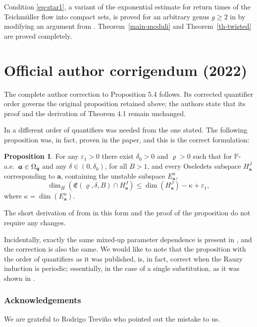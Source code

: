 \documentclass[10pt]{amsart}
\let\epsilon\varepsilon
\theoremstyle{plain}
\theoremstyle{definition}
\newcommand\bom{{\boldsymbol a}}\let\ba\bom
\newcommand\bq{{\boldsymbol q}}
\let\Om\Omega
\newcommand\Fre{\mathfrak{E}}
\renewcommand{\P}{\mathbb{P}}
\newtheorem*{prop*}{Proposition}
\begin{document}
Condition \eqref{eq-star1}, a variant of the exponential estimate for return times of the Teichmüller flow into compact sets, is proved for an arbitrary genus $g\ge 2$ in \cite[Prop.\,11.3]{BuSo18a} by modifying an
argument from \cite{buf-jams}. Theorem~\ref{main-moduli} and Theorem~\ref{th-twisted} are proved completely.


\section*{Official author corrigendum (2022)}
The complete author correction to Proposition 5.4 follows. Its corrected quantifier order governs the original proposition retained above; the authors state that its proof and the derivation of Theorem 4.1 remain unchanged.

In \cite[Prop.\,5.4]{BuSo21} a different order of quantifiers was needed from the one stated. The following proposition was, in fact, proven in the paper, and this is the correct formulation:

\begin{prop*}
For any $\epsilon_1>0$ there exist $\delta_0>0$ and $\varrho>0$ such that for $\P$\nobreakdash-a.e.\ $\bom\in\nobreak \Om_\bq$ and any $\delta\in (0,\delta_0)$, for all $B>1$, and every
Oseledets subspace $H_\bom^J$ corresponding to $\bom$, containing the unstable subspace $E^u_\bom$,
\[
\dim_H(\Fre(\varrho,\delta,B)\cap H_\bom^J) \le \dim(H_\bom^J) -\kappa + \epsilon_1,
\]
where $\kappa=\dim(E^u_\bom)$.
\end{prop*}

The short derivation of \cite[Th.\,4.1]{BuSo21} from \cite[Prop.\,5.4]{BuSo21} in this form and the proof of the proposition do not require any changes. 

Incidentally, exactly the same mixed-up parameter dependence is present in \hbox{\cite[Prop.\,9.1]{BuSo18a}}, and the correction is also the same.
We would like to note that the proposition with the order of quantifiers as it was published, is, in fact, correct when the Rauzy induction is periodic; essentially, in the case of a single substitution, as it was shown in \cite{BuSol2}.

\subsubsection*{Acknowledgements}
We are grateful to Rodrigo Trevi\~no who pointed out the mistake to us.
\end{document}
